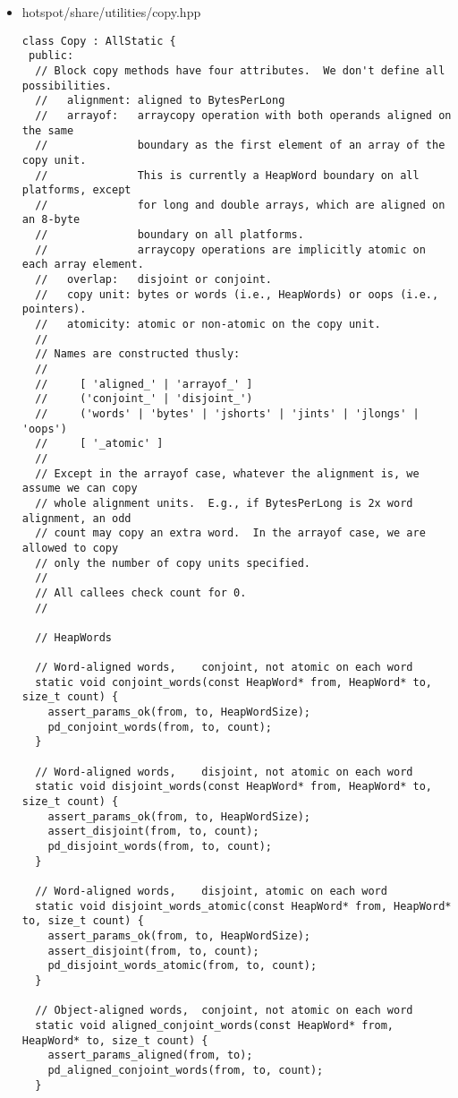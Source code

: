 \begin{itemize}
\item hotspot/share/utilities/copy.hpp\\
\begin{verbatim}
class Copy : AllStatic {
 public:
  // Block copy methods have four attributes.  We don't define all possibilities.
  //   alignment: aligned to BytesPerLong
  //   arrayof:   arraycopy operation with both operands aligned on the same
  //              boundary as the first element of an array of the copy unit.
  //              This is currently a HeapWord boundary on all platforms, except
  //              for long and double arrays, which are aligned on an 8-byte
  //              boundary on all platforms.
  //              arraycopy operations are implicitly atomic on each array element.
  //   overlap:   disjoint or conjoint.
  //   copy unit: bytes or words (i.e., HeapWords) or oops (i.e., pointers).
  //   atomicity: atomic or non-atomic on the copy unit.
  //
  // Names are constructed thusly:
  //
  //     [ 'aligned_' | 'arrayof_' ]
  //     ('conjoint_' | 'disjoint_')
  //     ('words' | 'bytes' | 'jshorts' | 'jints' | 'jlongs' | 'oops')
  //     [ '_atomic' ]
  //
  // Except in the arrayof case, whatever the alignment is, we assume we can copy
  // whole alignment units.  E.g., if BytesPerLong is 2x word alignment, an odd
  // count may copy an extra word.  In the arrayof case, we are allowed to copy
  // only the number of copy units specified.
  //
  // All callees check count for 0.
  //

  // HeapWords

  // Word-aligned words,    conjoint, not atomic on each word
  static void conjoint_words(const HeapWord* from, HeapWord* to, size_t count) {
    assert_params_ok(from, to, HeapWordSize);
    pd_conjoint_words(from, to, count);
  }

  // Word-aligned words,    disjoint, not atomic on each word
  static void disjoint_words(const HeapWord* from, HeapWord* to, size_t count) {
    assert_params_ok(from, to, HeapWordSize);
    assert_disjoint(from, to, count);
    pd_disjoint_words(from, to, count);
  }

  // Word-aligned words,    disjoint, atomic on each word
  static void disjoint_words_atomic(const HeapWord* from, HeapWord* to, size_t count) {
    assert_params_ok(from, to, HeapWordSize);
    assert_disjoint(from, to, count);
    pd_disjoint_words_atomic(from, to, count);
  }

  // Object-aligned words,  conjoint, not atomic on each word
  static void aligned_conjoint_words(const HeapWord* from, HeapWord* to, size_t count) {
    assert_params_aligned(from, to);
    pd_aligned_conjoint_words(from, to, count);
  }


\end{verbatim}
\end{itemize}
